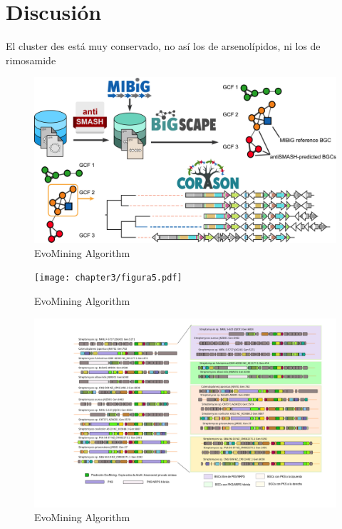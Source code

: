 \documentclass[12pt,twoside]{reedthesis}
\begin{document}
  \chapter{Discusión}\label{discusion}
  
  El cluster des está muy conservado, no así los de arsenolípidos, ni los
  de rimosamide
  
  \begin{figure}[h!tbp]
  \centering
  \includegraphics[angle = 0,scale = 1]{chapter3/corason_fig1.png}
  \caption[EvoMining Algorithm]{\normalsize{EvoMining Algorithm}}
  \label{fig:EvoMining Algorithms}
  \end{figure}
  
  \begin{figure}[h!tbp]
  \centering
  \texttt{[image: chapter3/figura5.pdf]}
  \caption[EvoMining Algorithm]{\normalsize{EvoMining Algorithm}}
  \label{fig:EvoMining Algorithms}
  \end{figure}
  
  \begin{figure}[h!tbp]
  \centering
  \includegraphics[angle = 0,scale = 1]{chapter3/Coelicolor.png}
  \caption[EvoMining Algorithm]{\normalsize{EvoMining Algorithm}}
  \label{fig:EvoMining Algorithms}
  \end{figure}
  
\end{document}
